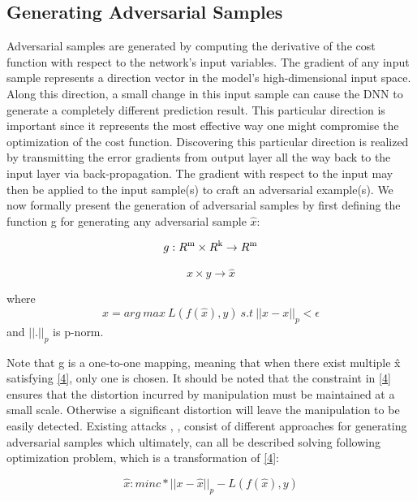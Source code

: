 \documentclass{article}
\begin{document}
	
\subsection{Generating Adversarial Samples}
Adversarial samples are generated by computing the derivative of the cost function with respect to the network’s input variables. The gradient of any input sample represents a direction vector in the model’s high-dimensional input space. Along this direction, a small change in this input sample can cause the DNN to generate a completely different prediction result. This particular direction is important since it represents the most effective way one might compromise the optimization of the cost function. Discovering this particular direction is realized by transmitting the error gradients from output layer all the way back to the input layer via back-propagation. The gradient with respect to the input may then be applied to the input sample(s) to craft an adversarial example(s). We now formally present the generation of adversarial samples by first defining the function g for generating any adversarial sample $\hat{x}$:

\begin{equation}
g : R\textsuperscript{m} \times R\textsuperscript{k} \rightarrow R\textsuperscript{m}
\end{equation}

\begin{equation*}
x \times y \rightarrow \hat{x}
\end{equation*}

where
\begin{equation}\label{4}
\hat{x} = arg \ max \ L(f(\hat{x}), y) \ s.t \ ||\hat{x}-x||_p < \epsilon
\end{equation} and $||.||_p$ is p-norm.
	
Note that g is a one-to-one mapping, meaning that when there exist multiple x̂ satisfying \eqref{4}, only one is chosen. It should be noted that the constraint in \eqref{4} ensures that the distortion incurred by manipulation must be maintained at a small scale. Otherwise a significant distortion will leave the manipulation to be easily detected. Existing attacks \cite{carlini2017towards}, \cite{szegedy2013intriguing}, \cite{papernot2016limitations} consist of different approaches for generating adversarial samples which ultimately, can all be described solving following optimization problem, which is a transformation of \eqref{4}:

\begin{equation}\label{5}
	\hat{x}: min c*||x - \hat{x}||_p - L(f(\hat{x}), y)
\end{equation}
\end{document}
